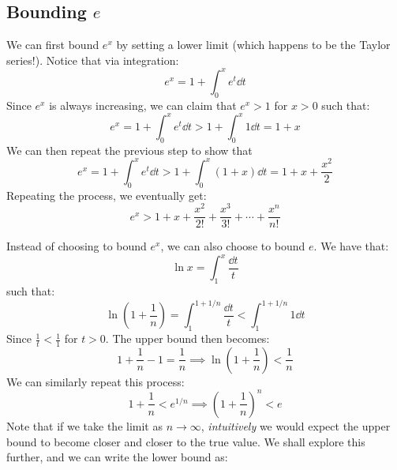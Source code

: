 \documentclass{article}
\begin{document}
 \subsection{Bounding $e$}
 \begin{idea}
     We can first bound $e^x$ by setting a lower limit (which happens to be the Taylor series!). Notice that via integration:
     \begin{equation}
         e^x = 1 + \int_0^x e^t \dd{t}
         \label{eq:}
     \end{equation}
     Since $e^x$ is always increasing, we can claim that $e^x > 1$ for $x>0$ such that:
     \begin{equation}
         e^x = 1 + \int_0^x e^t \dd{t} > 1 + \int_0^x 1 \dd{t} = 1 + x
         \label{eq:}
     \end{equation}
     We can then repeat the previous step to show that
     \begin{equation}
        e^x = 1 + \int_0^x e^t \dd{t} > 1 + \int_0^x (1+x) \dd{t} = 1 + x + \frac{x^2}{2}
        \label{eq:}
    \end{equation}
    Repeating the process, we eventually get:
    \begin{equation}
        e^x > 1 + x + \frac{x^2}{2!} + \frac{x^3}{3!} + \cdots + \frac{x^n}{n!}
        \label{eq:}
    \end{equation}
 \end{idea}
 Instead of choosing to bound $e^x$, we can also choose to bound $e$. We have that:
 \begin{equation}
     \ln x = \int_1^x \frac{\dd{t}}{t}
     \label{eq:}
 \end{equation}
 such that:
 \begin{equation}
     \ln\left(1+\frac{1}{n}\right) = \int_1^{1+1/n} \frac{\dd{t}}{t} < \int_1^{1+1/n} 1 \dd{t}
     \label{eq:}
 \end{equation}
 Since $\frac{1}{t} < \frac{1}{1}$ for $t>0$. The upper bound then becomes:
 \begin{equation}
     1+\frac{1}{n}-1 = \frac{1}{n} \implies \ln\left(1+\frac{1}{n}\right) < \frac{1}{n}
     \label{eq:}
 \end{equation}
 We can similarly repeat this process:
 \begin{equation}
     1+\frac{1}{n} < e^{1/n} \implies (1+\frac{1}{n})^n < e
     \label{eq:}
 \end{equation}
 Note that if we take the limit as $n\to\infty$, \textit{intuitively} we would expect the upper bound to become closer and closer to the true value. We shall explore this further, and we can write the lower bound as:
\end{document}
